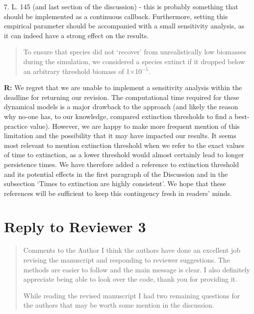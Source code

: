 \documentclass[12pt]{article}
\begin{document}
    \smallskip

    7. L. 145 (and last section of the discussion) - this is probably something that should be implemented as a continuous callback. Furthermore, setting this empirical parameter should be accompanied with a small sensitivity analysis, as it can indeed have a strong effect on the results.

    \smallskip

    \begin{quotation}
    To ensure that species did not `recover' from unrealistically low biomasses during the simulation, we considered a species extinct if it dropped below an arbitrary threshold biomass of 1$\times$10$^{-5}$.
    \end{quotation}

    \textbf{R:} We regret that we are unable to implement a sensitivity analysis within the deadline for returning our revision. The computational time required for these dynamical models is a major drawback to the approach (and likely the reason why no-one has, to our knowledge, compared extinction thresholds to find a best-practice value). However, we are happy to make more frequent mention of this limitation and the possibility that it may have impacted our results. 
    It seems most relevant to mention extinction threshold when we refer to the exact values of time to extinction, as a lower threshold would almost certainly lead to longer persistence times.
    We have therefore added a reference to extinction threshold and its potential effects in the first paragraph of the Discussion and in the subsection `Times to extinction are highly consistent'.
    We hope that these references will be sufficient to keep this contingency fresh in readers' minds.

\clearpage


\section*{Reply to Reviewer 3} 

  \begin{quotation}
    Comments to the Author
    I think the authors have done an excellent job revising the manuscript and responding to reviewer suggestions. The methods are easier to follow and the main message is clear. I also definitely appreciate being able to look over the code, thank you for providing it.   

    While reading the revised manuscript I had two remaining questions for the authors that may be worth some mention in the discussion. 

  \end{quotation}
\end{document}
